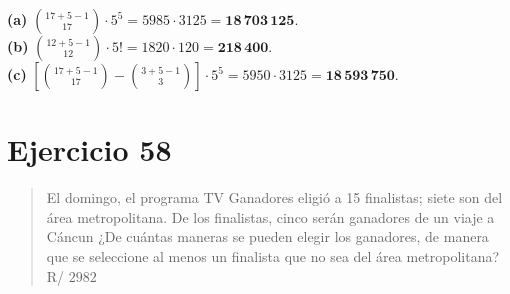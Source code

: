 \documentclass[11pt]{article}
\begin{document}
\begin{resp}
\textbf{(a)} $\binom{17+5-1}{17}\cdot 5^5=5985\cdot 3125=\mathbf{18\,703\,125}$.\\
\textbf{(b)} $\binom{12+5-1}{12}\cdot 5!=1820\cdot 120=\mathbf{218\,400}$.\\
\textbf{(c)} $\left[\binom{17+5-1}{17}-\binom{3+5-1}{3}\right]\cdot 5^5=5950\cdot 3125=\mathbf{18\,593\,750}$.
\end{resp}

\section*{Ejercicio 58}

\begin{quote}
El domingo, el programa TV Ganadores eligió a 15 finalistas; siete son del área metropolitana. De los finalistas, cinco serán ganadores de un viaje a Cáncun ¿De cuántas maneras se pueden elegir los ganadores, de manera que se seleccione al menos un finalista que no sea del área metropolitana? \hfill R/ $2982$
\end{quote}
\end{document}

